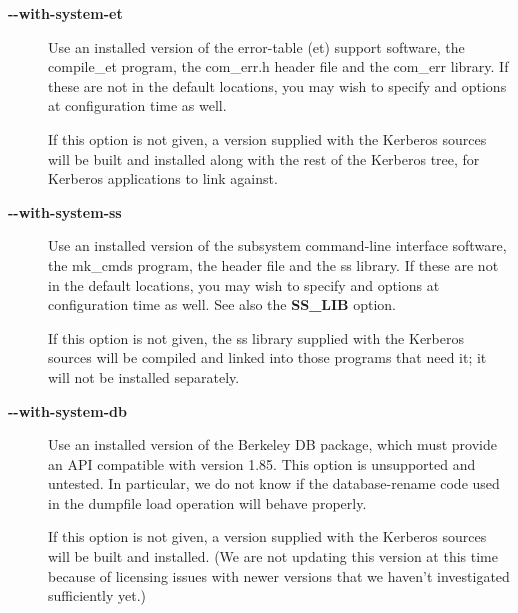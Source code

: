 \documentclass[letterpaper,10pt,english]{sphinxmanual}
\begin{document}
\begin{description}
\item[{\textbf{-}\textbf{-with-system-et}}] \leavevmode
Use an installed version of the error-table (et) support software,
the compile\_et program, the com\_err.h header file and the com\_err
library.  If these are not in the default locations, you may wish
to specify  and
 options at configuration time as
well.

If this option is not given, a version supplied with the Kerberos
sources will be built and installed along with the rest of the
Kerberos tree, for Kerberos applications to link against.

\item[{\textbf{-}\textbf{-with-system-ss}}] \leavevmode
Use an installed version of the subsystem command-line interface
software, the mk\_cmds program, the  header file and the
ss library.  If these are not in the default locations, you may
wish to specify  and
 options at configuration time as
well.  See also the \textbf{SS\_LIB} option.

If this option is not given, the ss library supplied with the
Kerberos sources will be compiled and linked into those programs
that need it; it will not be installed separately.

\item[{\textbf{-}\textbf{-with-system-db}}] \leavevmode
Use an installed version of the Berkeley DB package, which must
provide an API compatible with version 1.85.  This option is
unsupported and untested.  In particular, we do not know if the
database-rename code used in the dumpfile load operation will
behave properly.

If this option is not given, a version supplied with the Kerberos
sources will be built and installed.  (We are not updating this
version at this time because of licensing issues with newer
versions that we haven't investigated sufficiently yet.)

\end{description}
\end{document}
